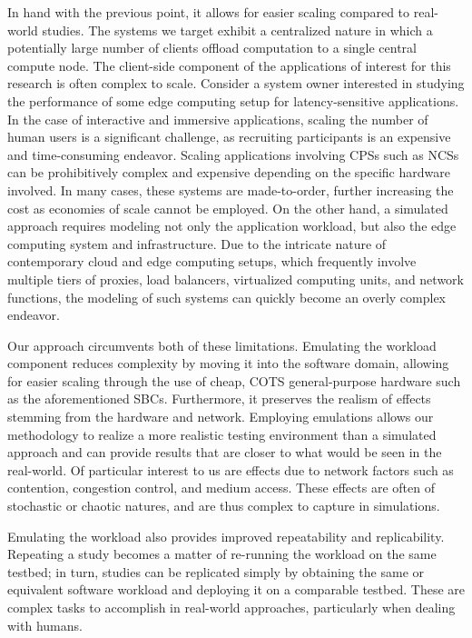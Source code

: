In hand with the previous point, it allows for easier scaling compared to real-world studies.
The systems we target exhibit a centralized nature in which a potentially large number of clients offload computation to a single central compute node.
The client-side component of the applications of interest for this research is often complex to scale.
Consider a system owner interested in studying the performance of some edge computing setup for latency-sensitive applications.
In the case of interactive and immersive applications, scaling the number of human users is a significant challenge, as recruiting participants is an expensive and time-consuming endeavor.
Scaling applications involving \glspl{CPS} such as \glspl{NCS} can be prohibitively complex and expensive depending on the specific hardware involved.
In many cases, these systems are made-to-order, further increasing the cost as economies of scale cannot be employed.
On the other hand, a simulated approach requires modeling not only the application workload, but also the edge computing system and infrastructure.
Due to the intricate nature of contemporary cloud and edge computing setups, which frequently involve multiple tiers of proxies, load balancers, virtualized computing units, and network functions, the modeling of such systems can quickly become an overly complex endeavor.

Our approach circumvents both of these limitations.
Emulating the workload component reduces complexity by moving it into the software domain, allowing for easier scaling through the use of cheap, \gls{COTS} general-purpose hardware such as the aforementioned \glspl{SBC}.
Furthermore, it preserves the realism of effects stemming from the hardware and network.
Employing emulations allows our methodology to realize a more realistic testing environment than a simulated approach and can provide results that are closer to what would be seen in the real-world.
Of particular interest to us are effects due to network factors such as contention, congestion control, and medium access.
These effects are often of stochastic or chaotic natures, and are thus complex to capture in simulations.

Emulating the workload also provides improved repeatability and replicability.
Repeating a study becomes a matter of re-running the workload on the same testbed;
in turn, studies can be replicated simply by obtaining the same or equivalent software workload and deploying it on a comparable testbed.
These are complex tasks to accomplish in real-world approaches, particularly when dealing with humans.

